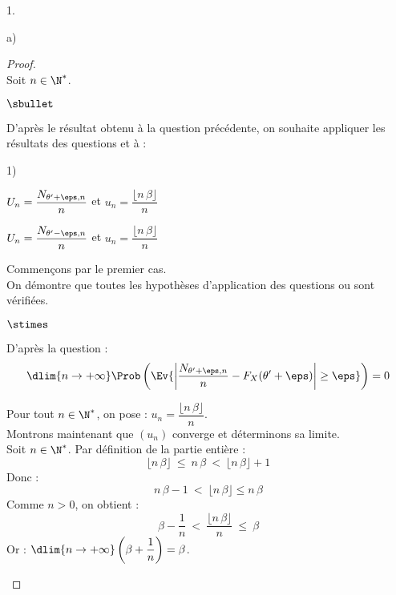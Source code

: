 \documentclass[11pt]{article}%
\begin{document}
\begin{noliste}{1.}
\begin{noliste}{a)}
    \begin{proof}~\\
    Soit $n\in \N^*$.
      \begin{noliste}{$\sbullet$}
	\item D'après le résultat obtenu à la question 
	précédente, on souhaite appliquer les résultats des questions 
	 et  à :
	\begin{noliste}{\scriptsize 1)}
	  \item $U_n = \dfrac{N_{\theta'+\eps,n}}{n}$ et $u_n = 
	  \dfrac{\lfloor n \, \beta \rfloor}{n}$
	  \item $U_n = \dfrac{N_{\theta'-\eps,n}}{n}$ et $u_n = 
	  \dfrac{\lfloor n \, \beta \rfloor}{n}$
	\end{noliste}
	Commençons par le premier cas.\\
	On démontre que toutes les hypothèses 
	d'application des questions  ou  sont 
	vérifiées.
	\begin{noliste}{$\stimes$}
	  \item D'après la question  :
	  \[
	    \dlim{n\to +\infty} \Prob\left( \Ev{ \left\vert
	    \dfrac{N_{\theta' + \eps,n}}{n} - F_X(\theta' +\eps) 
	    \right\vert \geq \eps}\right) = 0
	  \]
	  
	  
	  
	  \newpage
	  
	  
	  
	  \item Pour tout $n\in \N^*$, on pose : $u_n = 
	  \dfrac{\lfloor n\, \beta \rfloor}{n}$.\\
	  Montrons maintenant que $(u_n)$ converge 
	  et déterminons sa limite.\\
	  Soit $n\in\N^*$. Par définition de la partie entière :
	  \[
	    \lfloor n\, \beta \rfloor \ \leq \ n\, \beta \
	    < \ \lfloor n\, \beta \rfloor +1
	  \]
	  Donc :
	  \[
	    n\, \beta -1 \ < \ \lfloor n\, \beta \rfloor \leq n\, \beta
	  \]
	  Comme $n>0$, on obtient :
	  \[
	    \beta - \dfrac{1}{n} \ < \ \dfrac{\lfloor n\, \beta 
	    \rfloor}{n} \ \leq \ \beta
	  \]
	  Or : $\dlim{n\to +\infty} \left(\beta + \dfrac{1}{n} \right)
	  = \beta$.
	  

\end{noliste}
\end{noliste}
\end{proof}
\end{noliste}
\end{noliste}
\end{document}
